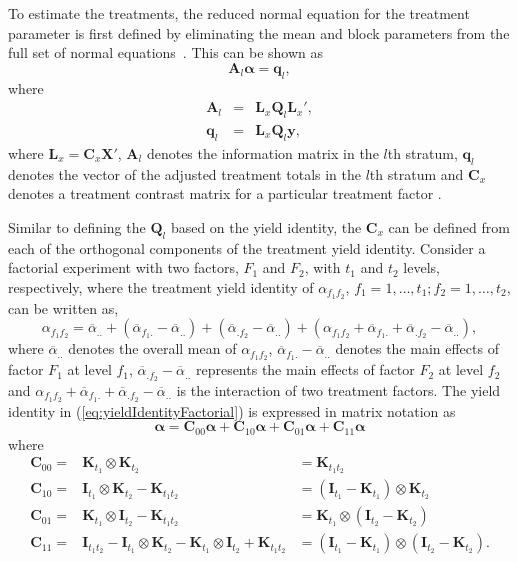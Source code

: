\documentclass[article]{jss}
\newcommand{\I}{\mathbf{I}}
\newcommand{\K}{\mathbf{K}}
\newcommand{\X}{\mathbf{X}}
\newcommand{\Q}{\mathbf{Q}}
\newcommand{\A}{\mathbf{A}}
\newcommand{\C}{\mathbf{C}}
\newcommand{\mL}{\mathbf{L}}
\begin{document}
To estimate the treatments, the reduced normal equation for the treatment parameter is first defined by eliminating the mean and block parameters from the full set of normal equations~\citep{John1987}. This can be shown as
\begin{equation}\label{eq:reduceNorml}
\A_l\bm{\alpha} = \bm{q}_l,
\end{equation}
where
\begin{eqnarray}
\nonumber \A_l &=& \mL_{x} \Q_l \mL_{x}',\\
\nonumber \bm{q}_l &=& \mL_{x} \Q_l\bm{y},
\end{eqnarray}
where $\mL_{x} = \C_x \X'$, $\A_l$ denotes the information matrix in the $l$th stratum, $\bm{q}_l$ denotes the vector of the adjusted treatment totals in the $l$th stratum and $\C_x$ denotes a treatment contrast matrix for a particular treatment factor \citep{John1987}. 

Similar to defining the $\Q_{l}$ based on the yield identity, the $\C_x$ can be defined from each of the orthogonal components of the treatment yield identity. Consider a factorial experiment with two factors, $F_1$ and $F_2$, with $t_1$ and $t_2$ levels, respectively, where the treatment yield identity of $\alpha_{f_1 f_2}$, $f_1= 1,\dots, t_1; f_2 = 1,\dots,t_2$, can be written as,
\begin{equation}
\label{eq:yieldIdentityFactorial}
\alpha_{f_1 f_2} = \overline{\alpha}_{..}+(\overline{\alpha}_{f_1 .} -\overline{\alpha}_{..}) + (\overline{\alpha}_{.f_2} -\overline{\alpha}_{..}) +(\alpha_{f_1 f_2} + \overline{\alpha}_{f_1 .} + \overline{\alpha}_{.f_2} -\overline{\alpha}_{..}),
\end{equation}
where $\overline{\alpha}_{..}$ denotes the overall mean of $\alpha_{f_1 f_2}$, $\overline{\alpha}_{f_1.} -\overline{\alpha}_{..}$ denotes the main effects of factor $F_1$ at level $f_1$, $\overline{\alpha}_{.f_2} -\overline{\alpha}_{..}$ represents the main effects of factor $F_2$ at level $f_2$ and $\alpha_{f_1 f_2} + \overline{\alpha}_{f_1.} + \overline{\alpha}_{. f_2} -\overline{\alpha}_{..}$ is the interaction of two treatment factors. The yield identity in (\ref{eq:yieldIdentityFactorial}) is expressed in matrix notation as
\[
\bm{\alpha} =  \C_{00} \bm{\alpha} +   \C_{10} \bm{\alpha} +   \C_{01} \bm{\alpha} +   \C_{11} \bm{\alpha} 
\]
where
\begin{eqnarray}
\nonumber \C_{00} = & \K_{t_1} \otimes \K_{t_2}& = \K_{t_1 t_2}\\
\nonumber \C_{10} = & \I_{t_1} \otimes \K_{t_2} - \K_{t_1 t_2}& = (\I_{t_1} - \K_{t_1}) \otimes \K_{t_2} \\
\nonumber \C_{01} = &\K_{t_1} \otimes \I_{t_2} - \K_{t_1 t_2}& =  \K_{t_1} \otimes (\I_{t_2} - \K_{t_2})\\
\nonumber \C_{11} = &\I_{t_1 t_2}-\I_{t_1} \otimes \K_{t_2} - \K_{t_1} \otimes \I_{t_2} + \K_{t_1 t_2} &= (\I_{t_1} - \K_{t_1}) \otimes (\I_{t_2} - \K_{t_2}).
\end{eqnarray}
\end{document}
